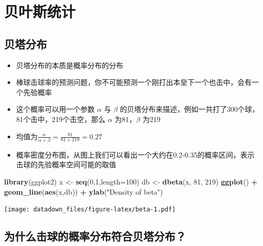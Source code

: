\documentclass[]{book}
\newenvironment{Shaded}{\begin{snugshade}}{\end{snugshade}}
\newcommand{\DataTypeTok}[1]{\textcolor[rgb]{0.13,0.29,0.53}{#1}}
\newcommand{\DecValTok}[1]{\textcolor[rgb]{0.00,0.00,0.81}{#1}}
\newcommand{\KeywordTok}[1]{\textcolor[rgb]{0.13,0.29,0.53}{\textbf{#1}}}
\newcommand{\NormalTok}[1]{#1}
\newcommand{\OperatorTok}[1]{\textcolor[rgb]{0.81,0.36,0.00}{\textbf{#1}}}
\newcommand{\StringTok}[1]{\textcolor[rgb]{0.31,0.60,0.02}{#1}}
\begin{document}
\hypertarget{bayes}{%
\chapter{贝叶斯统计}\label{bayes}}

\hypertarget{ux8d1dux5854ux5206ux5e03}{%
\section{贝塔分布}\label{ux8d1dux5854ux5206ux5e03}}

\begin{itemize}
\item
  贝塔分布的本质是概率分布的分布
\item
  棒球击球率的预测问题，你不可能预测一个刚打出本垒下一个也击中，会有一个先验概率
\item
  这个概率可以用一个参数 \(\alpha\) 与 \(\beta\) 的贝塔分布来描述，例如一共打了300个球，81个击中，219个击空，那么 \(\alpha\) 为81，\(\beta\) 为219
\item
  均值为\(\frac{\alpha}{\alpha + \beta} = \frac{81}{81+219} = 0.27\)
\item
  概率密度分布图，从图上我们可以看出一个大约在0.2-0.35的概率区间，表示击球的先验概率空间可能的取值
\end{itemize}

\begin{Shaded}
\begin{Highlighting}[]
\KeywordTok{library}\NormalTok{(ggplot2)}
\NormalTok{x <-}\StringTok{ }\KeywordTok{seq}\NormalTok{(}\DecValTok{0}\NormalTok{,}\DecValTok{1}\NormalTok{,}\DataTypeTok{length=}\DecValTok{100}\NormalTok{)}
\NormalTok{db <-}\StringTok{ }\KeywordTok{dbeta}\NormalTok{(x, }\DecValTok{81}\NormalTok{, }\DecValTok{219}\NormalTok{)}
\KeywordTok{ggplot}\NormalTok{() }\OperatorTok{+}\StringTok{ }\KeywordTok{geom_line}\NormalTok{(}\KeywordTok{aes}\NormalTok{(x,db)) }\OperatorTok{+}\StringTok{ }\KeywordTok{ylab}\NormalTok{(}\StringTok{"Density of beta"}\NormalTok{)}
\end{Highlighting}
\end{Shaded}

\texttt{[image: datadown\_files/figure-latex/beta-1.pdf]}

\hypertarget{ux4e3aux4ec0ux4e48ux51fbux7403ux7684ux6982ux7387ux5206ux5e03ux7b26ux5408ux8d1dux5854ux5206ux5e03}{%
\section{为什么击球的概率分布符合贝塔分布？}\label{ux4e3aux4ec0ux4e48ux51fbux7403ux7684ux6982ux7387ux5206ux5e03ux7b26ux5408ux8d1dux5854ux5206ux5e03}}
\end{document}
